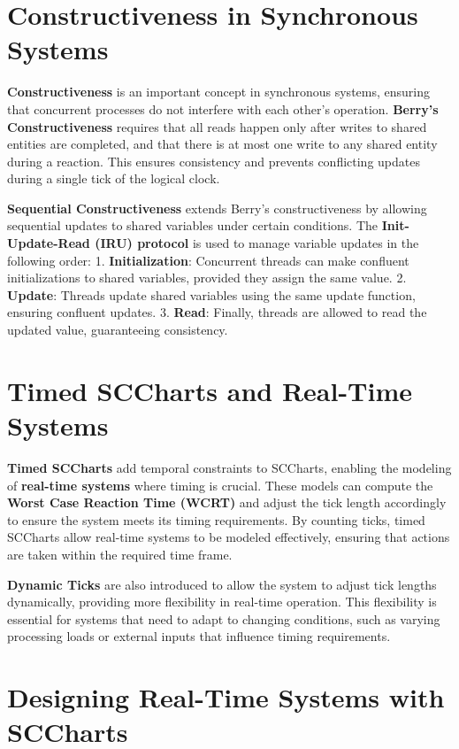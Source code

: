 \documentclass[
  14pt,
  a4paper,
  DIV=11,
  numbers=noendperiod,
  headinclude=true,
  footinclude=true]{scrreprt}
\begin{document}
\section{Constructiveness in Synchronous
Systems}\label{constructiveness-in-synchronous-systems}

\textbf{Constructiveness} is an important concept in synchronous
systems, ensuring that concurrent processes do not interfere with each
other's operation. \textbf{Berry's Constructiveness} requires that all
reads happen only after writes to shared entities are completed, and
that there is at most one write to any shared entity during a reaction.
This ensures consistency and prevents conflicting updates during a
single tick of the logical clock.

\textbf{Sequential Constructiveness} extends Berry's constructiveness by
allowing sequential updates to shared variables under certain
conditions. The \textbf{Init-Update-Read (IRU) protocol} is used to
manage variable updates in the following order: 1.
\textbf{Initialization}: Concurrent threads can make confluent
initializations to shared variables, provided they assign the same
value. 2. \textbf{Update}: Threads update shared variables using the
same update function, ensuring confluent updates. 3. \textbf{Read}:
Finally, threads are allowed to read the updated value, guaranteeing
consistency.

\section{Timed SCCharts and Real-Time
Systems}\label{timed-sccharts-and-real-time-systems}

\textbf{Timed SCCharts} add temporal constraints to SCCharts, enabling
the modeling of \textbf{real-time systems} where timing is crucial.
These models can compute the \textbf{Worst Case Reaction Time (WCRT)}
and adjust the tick length accordingly to ensure the system meets its
timing requirements. By counting ticks, timed SCCharts allow real-time
systems to be modeled effectively, ensuring that actions are taken
within the required time frame.

\textbf{Dynamic Ticks} are also introduced to allow the system to adjust
tick lengths dynamically, providing more flexibility in real-time
operation. This flexibility is essential for systems that need to adapt
to changing conditions, such as varying processing loads or external
inputs that influence timing requirements.

\section{Designing Real-Time Systems with
SCCharts}\label{designing-real-time-systems-with-sccharts}
\end{document}
